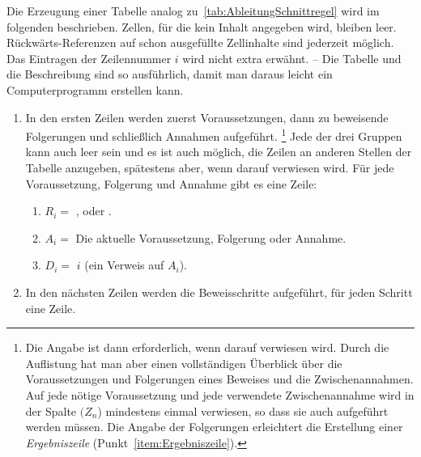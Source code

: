 Die Erzeugung einer Tabelle analog zu~\vref{tab:AbleitungSchnittregel} wird im folgenden beschrieben.
Zellen, für die kein Inhalt angegeben wird, bleiben leer.
Rückwärts-Referenzen auf schon ausgefüllte Zellinhalte sind jederzeit möglich.
Das Eintragen der Zeilennummer $i$ wird nicht extra erwähnt.
-- Die Tabelle und die Beschreibung sind so ausführlich, damit man daraus leicht ein Computerprogramm erstellen kann.

\begin{enumerate}
	\item In den ersten Zeilen werden zuerst Voraussetzungen, dann zu beweisende Folgerungen und schließlich Annahmen aufgeführt.%
	\footnote{%
		Die Angabe ist dann erforderlich, wenn darauf verwiesen wird.
		Durch die Auflistung hat man aber einen vollständigen Überblick über die Voraussetzungen und Folgerungen eines Beweises und die Zwischenannahmen.
		Auf jede nötige Voraussetzung und jede verwendete Zwischenannahme wird in der Spalte $(Z_n$) mindestens einmal verwiesen, so dass sie auch aufgeführt werden müssen.
		Die Angabe der Folgerungen erleichtert die Erstellung einer \emph{Ergebniszeile} (\seename Punkt~\ref{item:Ergebniszeile}).
	}
	Jede der drei Gruppen kann auch leer sein und es ist auch möglich, die Zeilen an anderen Stellen der Tabelle anzugeben, spätestens aber, wenn darauf verwiesen wird.
	Für jede Voraussetzung, Folgerung und Annahme gibt es eine Zeile:
	\begin{enumerate}
		\item $R_i =$ ,  oder .
		\item $A_i =$ Die aktuelle Voraussetzung, Folgerung oder Annahme.
		\item $D_i =$ $i$ \quad (ein Verweis auf $A_i$).
	\end{enumerate}
	\item In den nächsten Zeilen werden die Beweisschritte aufgeführt, für jeden Schritt eine Zeile.


\end{enumerate}
